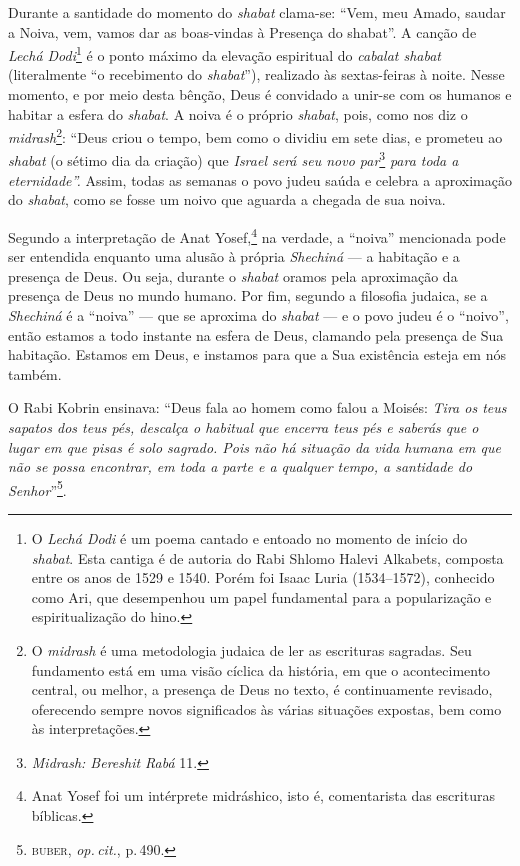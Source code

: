 Durante a santidade do momento do \emph{shabat} clama-se: ``Vem,
meu Amado, saudar a Noiva, vem, vamos dar as boas-vindas à Presença do
shabat''. A canção de \emph{Lechá Dodi}\footnote{O \emph{Lechá Dodi} é
  um poema cantado e entoado no momento de início do \emph{shabat}. Esta
  cantiga é de autoria do Rabi Shlomo Halevi Alkabets, composta entre os
  anos de 1529 e 1540. Porém foi Isaac Luria (1534--1572), conhecido como
  Ari, que desempenhou um papel fundamental para a popularização e
  espiritualização do hino.} é o ponto máximo da elevação espiritual do
\emph{cabalat shabat} (literalmente ``o recebimento do \emph{shabat}''), realizado às
sextas-feiras à noite. Nesse momento, e por meio desta bênção, Deus é
convidado a unir-se com os humanos e habitar a esfera do \emph{shabat}.
A noiva é o próprio \emph{shabat}, pois, como nos diz o
\emph{midrash}\footnote{O \emph{midrash} é uma metodologia judaica de
  ler as escrituras sagradas. Seu fundamento está em uma visão cíclica
  da história, em que o acontecimento central, ou melhor, a presença de
  Deus no texto, é continuamente revisado, oferecendo sempre novos
  significados às várias situações expostas, bem como às interpretações.}:
``Deus criou o tempo, bem como o dividiu em sete dias, e prometeu
ao \emph{shabat} (o sétimo dia da criação) que \emph{Israel será seu novo
par}\footnote{\emph{Midrash: Bereshit Rabá} 11.} \emph{para toda a
eternidade''.} Assim, todas as semanas o povo judeu saúda e celebra a
aproximação do \emph{shabat}, como se fosse um noivo que aguarda a
chegada de sua noiva.

Segundo a interpretação de Anat Yosef,\footnote{Anat Yosef foi um
  intérprete midráshico, isto é, comentarista das escrituras bíblicas.}
na verdade, a ``noiva'' mencionada pode ser entendida enquanto uma
alusão à própria \emph{Shechiná} --- a habitação e a presença de Deus.
Ou seja, durante o \emph{shabat} oramos pela aproximação da presença de
Deus no mundo humano. Por fim, segundo a filosofia judaica, se a
\emph{Shechiná} é a ``noiva'' --- que se aproxima do \emph{shabat} --- e
o povo judeu é o ``noivo'', então estamos a todo instante na esfera de
Deus, clamando pela presença de Sua habitação. Estamos em Deus, e
instamos para que a Sua existência esteja em nós também.

O Rabi Kobrin ensinava: ``Deus fala ao homem como falou a Moisés:
\emph{Tira os teus sapatos dos teus pés, descalça o habitual que encerra teus
pés e saberás que o lugar em que pisas é solo sagrado. Pois não há
situação da vida humana em que não se possa encontrar, em toda a parte e
a qualquer tempo, a santidade do Senhor}''\footnote{\textsc{buber}, \emph{op.\,cit.},
  p.\,490.}.

